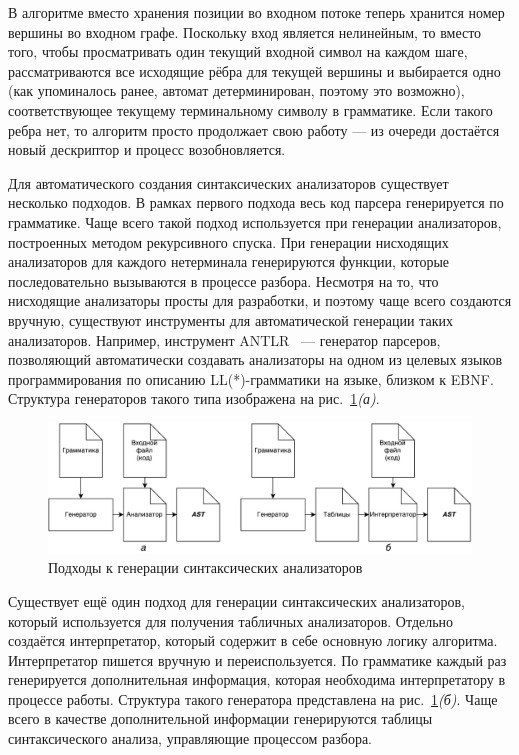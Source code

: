 В алгоритме вместо хранения позиции во входном потоке теперь хранится номер вершины во входном графе. Поскольку вход является нелинейным, то вместо того, чтобы просматривать один текущий входной символ на каждом шаге, рассматриваются все исходящие рёбра для текущей вершины и выбирается одно (как упоминалось ранее, автомат детерминирован, поэтому это возможно), соответствующее текущему терминальному символу в грамматике. Если такого ребра нет, то алгоритм просто продолжает свою работу --- из очереди достаётся новый дескриптор и процесс возобновляется. 

Для автоматического создания синтаксических анализаторов существует несколько подходов. В рамках первого подхода весь код парсера генерируется по грамматике. Чаще всего такой подход используется при генерации анализаторов, построенных методом рекурсивного спуска. При генерации нисходящих анализаторов для каждого нетерминала генерируются функции, которые последовательно вызываются в процессе разбора. Несмотря на то, что нисходящие анализаторы просты для разработки, и поэтому чаще всего создаются вручную, существуют инструменты для автоматической генерации таких анализаторов. Например, инструмент ANTLR~\cite{antlr} --- генератор парсеров, позволяющий автоматически создавать анализаторы на одном из целевых языков программирования по описанию LL(*)-грамматики на языке, близком к EBNF. Структура генераторов такого типа изображена на рис.~\ref{genTypes}{\it (а)}.

\begin{figure}
 \centering
 \includegraphics[width=\textwidth]{Ragozina/pics/GeneratorTypes.pdf}
 \caption{Подходы к генерации синтаксических анализаторов}
 \label{genTypes}
\end{figure}

Существует ещё один подход для генерации синтаксических анализаторов, который используется для получения табличных анализаторов. Отдельно создаётся интерпретатор, который содержит в себе основную логику алгоритма. Интерпретатор пишется вручную и переиспользуется. По грамматике каждый раз генерируется дополнительная информация, которая необходима интерпретатору в процессе работы. Структура такого генератора представлена на рис.~\ref{genTypes}{\it (б)}. Чаще всего в качестве дополнительной информации генерируются таблицы синтаксического анализа, управляющие процессом разбора.

